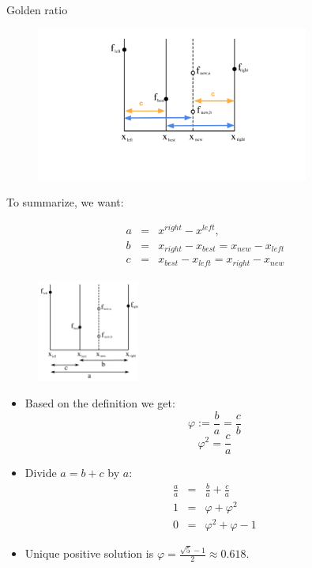 \documentclass[11pt,compress,t,notes=noshow, xcolor=table]{beamer}
\begin{document}
\begin{vbframe}{Golden ratio}
\begin{figure}
\includegraphics[width=0.8\textwidth]{figure_man/goldensec-4.png}\\
\end{figure}

\framebreak 

To summarize, we want: 

\begin{eqnarray*}
    a &=& x^{right}-x^{left}, \\
    b &=& x_{right} - x_{best} = x_{new} - x_{left} \\
    c &=& x_{best} - x_{left} = x_{right} - x_{new}
\end{eqnarray*}

\vspace*{-0.3cm}

\begin{figure}
\includegraphics[width=0.3\textwidth]{figure_man/goldensec.png}\\
\end{figure}

\begin{itemize}
\item Based on the definition we get: 
$$
\varphi := \frac{b}{a} = \frac{c}{b}
$$
$$
\varphi^2 = \frac{c}{a}
$$

\item Divide $a = b + c$ by $a$:
\begin{eqnarray*}
\frac{a}{a} &=& \frac{b}{a} + \frac{c}{a} \\
1 &=& \varphi + \varphi^2 \\
0 &=& \varphi^2 + \varphi - 1
\end{eqnarray*}
\item Unique positive solution is $\varphi = \frac{\sqrt{5}-1}{2} \approx 0.618$.


\end{itemize}
\end{vbframe}
\end{document}
